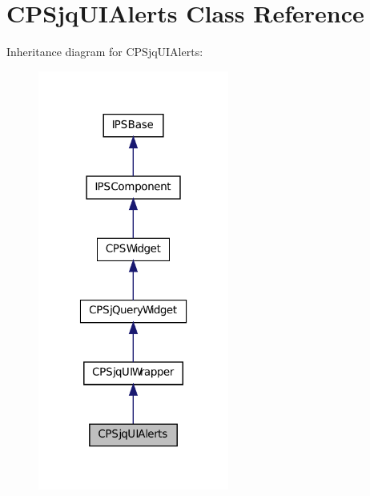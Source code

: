 \hypertarget{classCPSjqUIAlerts}{
\section{CPSjqUIAlerts Class Reference}
\label{classCPSjqUIAlerts}
}


Inheritance diagram for CPSjqUIAlerts:\nopagebreak
\begin{figure}[H]
\begin{center}
\leavevmode
\includegraphics[width=178pt]{classCPSjqUIAlerts__inherit__graph}
\end{center}
\end{figure}


